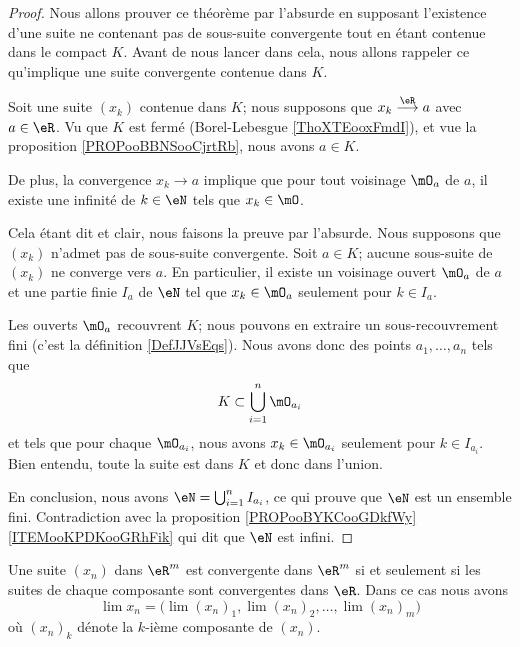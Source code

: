 \begin{proof}
    Nous allons prouver ce théorème par l'absurde en supposant l'existence d'une suite ne contenant pas de sous-suite convergente tout en étant contenue dans le compact \( K\). Avant de nous lancer dans cela, nous allons rappeler ce qu'implique une suite convergente contenue dans \( K\).

    Soit une suite \( (x_k)\) contenue dans \( K\); nous supposons que \( x_k\stackrel{\eR}{\longrightarrow} a\) avec \( a\in \eR\). Vu que \( K\) est fermé (Borel-Lebesgue \ref{ThoXTEooxFmdI}), et vue la proposition \ref{PROPooBBNSooCjrtRb}, nous avons \( a\in K\).

    De plus, la convergence \( x_k\to a\) implique que pour tout voisinage \( \mO_a\) de \( a\), il existe une infinité de \( k\in \eN\) tels que \( x_k\in\mO\).

    Cela étant dit et clair, nous faisons la preuve par l'absurde. Nous supposons que \( (x_k)\) n'admet pas de sous-suite convergente. Soit \( a\in K\); aucune sous-suite de \( (x_k)\) ne converge vers \( a\). En particulier, il existe un voisinage ouvert \( \mO_a\) de \( a\) et une partie finie \( I_a\) de \( \eN\) tel que \( x_k\in \mO_a\) seulement pour \( k\in I_a\).

    Les ouverts \( \mO_a\) recouvrent \( K\); nous pouvons en extraire un sous-recouvrement fini (c'est la définition \ref{DefJJVsEqs}). Nous avons donc des points \( a_1,\ldots, a_n\) tels que 
    \begin{equation}
        K\subset \bigcup_{i=1}^n\mO_{a_i}
    \end{equation}
    et tels que pour chaque \( \mO_{a_i}\), nous avons \( x_k\in \mO_{a_i}\) seulement pour \( k\in I_{a_i}\). Bien entendu, toute la suite est dans \( K\) et donc dans l'union.

    En conclusion, nous avons \( \eN=\bigcup_{i=1}^n I_{a_i}\), ce qui prouve que \( \eN\) est un ensemble fini. Contradiction avec la proposition \ref{PROPooBYKCooGDkfWy}\ref{ITEMooKPDKooGRhFik} qui dit que \( \eN\) est infini.
\end{proof}

\begin{proposition}		\label{PropCvRpComposante}
	Une suite $(x_n)$ dans $\eR^m$ est convergente dans $\eR^m$ si et seulement si les suites de chaque composante sont convergentes dans $\eR$. Dans ce cas nous avons
	 \begin{equation}
		 \lim x_n=\Big( \lim(x_n)_1,\lim (x_n)_2,\ldots,\lim (x_n)_m \Big)
	 \end{equation}
	 où $(x_n)_k$ dénote la $k$-ième composante de $(x_n)$.
\end{proposition}

